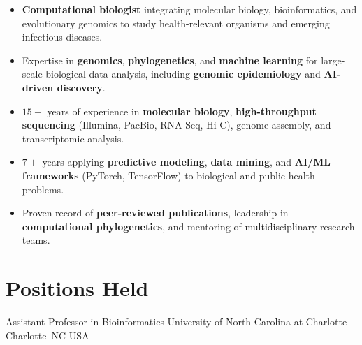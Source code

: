 \documentclass[11pt, letterpaper, sans]{moderncv}
\begin{document}
\maketitle


\begin{itemize}
    \item \textbf{Computational biologist} integrating molecular biology, bioinformatics, and evolutionary genomics to study health-relevant organisms and emerging infectious diseases.
    \item Expertise in \textbf{genomics}, \textbf{phylogenetics}, and \textbf{machine learning} for large-scale biological data analysis, including \textbf{genomic epidemiology} and \textbf{AI-driven discovery}.
    \item $15+$ years of experience in \textbf{molecular biology}, \textbf{high-throughput sequencing} (Illumina, PacBio, RNA-Seq, Hi-C), genome assembly, and transcriptomic analysis.
    \item $7+$ years applying \textbf{predictive modeling}, \textbf{data mining}, and \textbf{AI/ML frameworks} (PyTorch, TensorFlow) to biological and public-health problems.
    \item Proven record of \textbf{peer-reviewed publications}, leadership in \textbf{computational phylogenetics}, and mentoring of multidisciplinary research teams.
\end{itemize}


\section{Positions Held}

    {Assistant Professor in Bioinformatics}
    {University of North Carolina at Charlotte}
    {Charlotte--NC}
    {USA}
    {}
\end{document}
